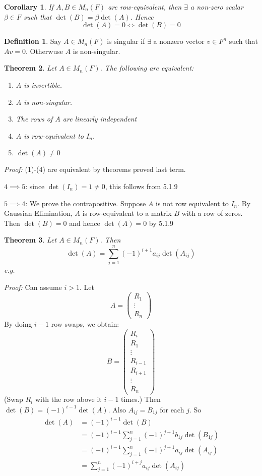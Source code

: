 \documentclass{report}
\newtheorem{theorem}{Theorem}[subsection]
\newtheorem*{corollary}{Corollary}
\theoremstyle{remark}
\theoremstyle{definition}
\newtheorem{definition}[theorem]{Definition}
\theoremstyle{definition}
\theoremstyle{theorem}
\providecommand{\vectiii}[3]{\begin{pmatrix}#1\\#2\\#3\end{pmatrix}}
\begin{document}
\begin{corollary}
If $A,B \in M_n(F)$ are row-equivalent, then $\exists$ a non-zero scalar $\beta \in F$ such that $\det(B) = \beta\det(A)$. Hence
\[\det(A) = 0 \iff \det(B) = 0\]
\end{corollary}
\begin{definition}
Say $A \in M_n(F)$ is singular if $\exists$ a nonzero vector $v \in F^n$ such that $Av=0$. Otherwuse $A$ is non-singular.
\end{definition}
\begin{theorem}
Let $A \in M_n(F)$. The following are equivalent:
\begin{enumerate}
    \item $A$ is invertible.
    \item $A$ is non-singular.
    \item The rows of $A$ are linearly independent
    \item $A$ is row-equivalent to $I_n$.
    \item $\det(A) \neq 0$
\end{enumerate}
\end{theorem}
\emph{Proof:} (1)-(4) are equivalent by theorems proved last term. \par
$4 \implies 5$: since $\det(I_n) = 1 \neq 0$, this follows from 5.1.9\par
$5 \implies 4$: We prove the contrapositive. Suppose $A$ is not row equivalent to $I_n$. By Gaussian Elimination, $A$ is row-equivalent to a matrix $B$ with a row of zeros. Then $\det(B)=0$ and hence $\det(A)=0$ by 5.1.9
\begin{theorem}
Let $A \in M_n(F)$. Then 
\[\det(A) = \sum^n_{j=1}(-1)^{i+1}a_{ij}\det(A_{ij})\]
e.g.
\end{theorem}
\emph{Proof:} Can assume $i>1$. Let
\[A=\vectiii{R_1}{\vdots}{R_n}\]
By doing $i-1$ row swaps, we obtain:
\[B = \begin{pmatrix}
R_i\\
R_1\\
\vdots\\
R_{i-1}\\
R_{i+1}\\
\vdots\\
R_n
\end{pmatrix}\]
(Swap $R_i$ with the row above it $i-1$ times.) Then $\det(B)=(-1)^{i-1}\det(A)$. Also $A_{ij}=B_{1j}$ for each $j$. So
\begin{align*}
    \det(A)&=(-1)^{i-1}\det(B)\\
    &=(-1)^{i-1}\sum^n_{j=1}(-1)^{j+1}b_{1j}\det(B_{1j})\\
    &=(-1)^{i-1}\sum^n_{j=1}(-1)^{j+1}a_{ij}\det(A_{ij})\\
    &=\sum^n_{j=1}(-1)^{i+j}a_{ij}\det(A_{ij})
\end{align*}
\end{document}
